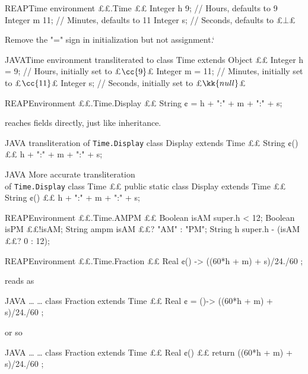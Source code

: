 \begin{Code}{REAP}{Time environment}
££.Time {££
  Integer h 9; // Hours, defaults to 9
  Integer m 11; // Minutes, defaults to 11
  Integer s; // Seconds, defaults to £$⊥$£
}
\end{Code}
Remove the "=" sign in initialization but not assignment.`
\begin{Code}[minipage,width=20em]{JAVA}{Time environment transliterated to \Java}
class Time extends Object {££
  Integer h = 9; // Hours, initially set to £$\cc{9}$£
  Integer m = 11; // Minutes, initially set to £$\cc{11}$£
  Integer s; // Seconds, initially set to £$\kk{null}$£
}
\end{Code}

\begin{Code}{REAP}{Environment }
££.Time.Display {££
  String ¢ = h + ":" + m + ":" + s;
}
\end{Code}
reaches fields directly, just like inheritance.

\begin{Code}[minipage,width=22em]{JAVA}
{\Java transliteration of \texttt{Time.Display}}
class Display extends Time {££
  String ¢() {££
     h + ":" + m + ":" + s;
  }
}
\end{Code}

\begin{Code}[minipage,width=20em]{JAVA}%
{More accurate \Java transliteration \\
of \Java \texttt{Time.Display}}
class Time {££
  public static class Display extends Time {££
    String ¢() {££
       h + ":" + m + ":" + s;
    }
  }
}
\end{Code}

\begin{Code}{REAP}{Environment }
££.Time.AMPM {££
  Boolean isAM super.h < 12;
  Boolean isPM ££!isAM;
  String ampm isAM ££? "AM" : "PM";
  String h super.h - (isAM ££? 0 : 12);
}
\end{Code}

\begin{Code}{REAP}{Environment }
££.Time.Fraction {££
  Real ¢() -> ((60*h + m) + s)/24./60 ;
}
\end{Code}
reads as
\begin{Code}[minipage,width=20em]{JAVA}{ … \Java … }
class Fraction extends Time {££
  Real ¢ = ()-> ((60*h + m) + s)/24./60 ;
}
\end{Code}
or so
\begin{Code}[minipage,width=20em]{JAVA}{ … \Java … }
class Fraction extends Time {££
  Real ¢() {££ return ((60*h + m) + s)/24./60 ; }
}
\end{Code}


